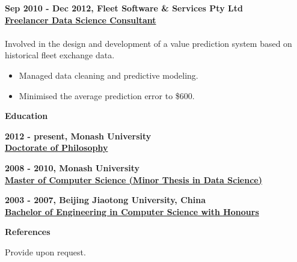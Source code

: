 \documentclass[a4paper,8pt,final]{memoir}
\newcommand{\Sep}{\vspace{1.5em}}
\newcommand{\SmallSep}{\vspace{0.5em}}
\newcommand{\CVSection}[1]
	{\Large\textbf{#1}\par
	\SmallSep\normalsize\normalfont}
\newcommand{\CVItem}[1]
	{\textbf{\color{RoyalBlue} #1}}
\begin{document}
\CVItem{Sep 2010 - Dec 2012, Fleet Software \& Services Pty Ltd}\\
\underline{\textbf{Freelancer Data Science Consultant}}\\
\\
Involved in the design and development of a value prediction system based on historical fleet exchange data.
    \begin{itemize}
        \item Managed data cleaning and predictive modeling.
        \item Minimised the average prediction error to \$600.
    \end{itemize}
\Sep
\Sep
\Sep
\CVSection{Education}
\CVItem{2012 - present, Monash University}\\
\underline{\textbf{Doctorate of Philosophy}}
\Sep

\CVItem{2008 - 2010, Monash University}\\
\underline{\textbf{Master of Computer Science (Minor Thesis in Data Science)}}
\Sep

\CVItem{2003 - 2007, Beijing Jiaotong University, China}\\
\underline{\textbf{Bachelor of Engineering in Computer Science with Honours}}
\Sep
\Sep
\Sep

\CVSection{References}
Provide upon request.
%
%
%
\end{document}
